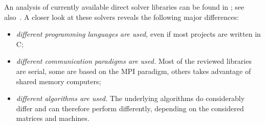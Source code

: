 \documentclass[acmtocl]{acmtrans2m}
\begin{document}
%
%

An analysis of currently available direct solver libraries can be found
in \cite{davis05summary}; see also~\cite[Section 6.7]{dongarra98numerical}.
A closer look at these solvers reveals the following major
differences:
\begin{itemize}
\item {\sl different programming languages are used,} even if most projects are
written in C;

\item {\sl different communication paradigms are used.} 
 Most of the reviewed libraries are serial, some are based on the MPI
 paradigm, others takes advantage of shared memory computers;

\item {\sl different algorithms are used.} The underlying algorithms do
considerably differ
and can therefore perform differently, depending on the considered matrices and
machines.

\end{itemize}
\end{document}
